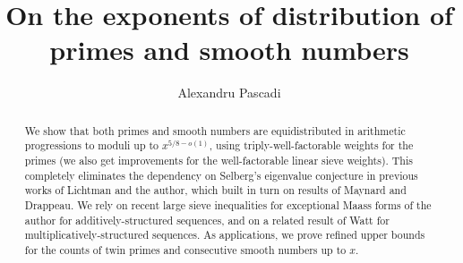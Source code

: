 \documentclass[reqno,11pt]{amsart}
\title{On the exponents of distribution of primes and smooth numbers}
\author[Alexandru Pascadi]{Alexandru Pascadi}
\theoremstyle{remark}
\numberwithin{equation}{section}
\begin{document}
\begin{abstract}
    We show that both primes and smooth numbers are equidistributed in arithmetic progressions to moduli up to $x^{5/8 - o(1)}$, using triply-well-factorable weights for the primes (we also get improvements for the well-factorable linear sieve weights). This completely eliminates the dependency on Selberg's eigenvalue conjecture in previous works of Lichtman and the author, which built in turn on results of Maynard and Drappeau. We rely on recent large sieve inequalities for exceptional Maass forms of the author for additively-structured sequences, and on a related result of Watt for multiplicatively-structured sequences. As applications, we prove refined upper bounds for the counts of twin primes and consecutive smooth numbers up to $x$.
\end{abstract}

\maketitle

\vspace{-0.6cm}
{
\setlength{\parskip}{0em}
\setcounter{tocdepth}{1}
\tableofcontents
}
\vspace{-0.7cm}
\end{document}
